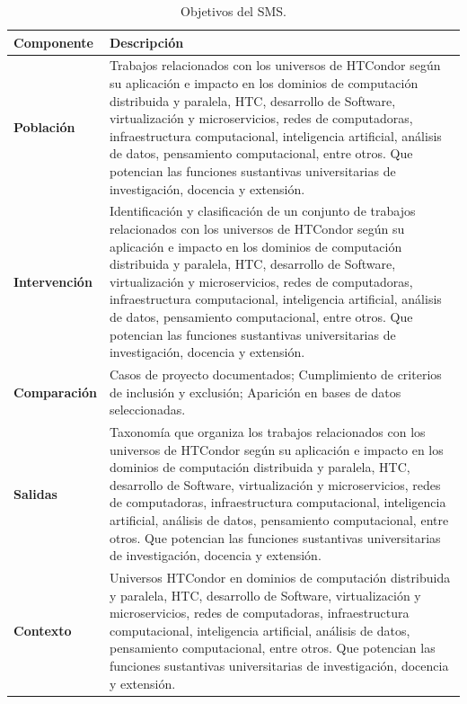 \begin{table}[htbp]
	\centering
	\caption{Objetivos del SMS.}
	\label{table:PICOC}
	\renewcommand{\arraystretch}{1}  %
	\begin{tabular}{p{1.4cm}p{6.4cm}}
		\toprule
		\textbf{Componente}  & \textbf{Descripción}                \\
		\midrule
		\textbf{Población} & Trabajos relacionados con los universos de HTCondor según su aplicación e impacto en los dominios de computación distribuida y paralela, HTC, desarrollo de Software, virtualización y microservicios, redes de computadoras, infraestructura computacional, inteligencia artificial, análisis de datos, pensamiento computacional, entre otros. Que potencian las funciones sustantivas universitarias de investigación, docencia y extensión.\\
		\addlinespace[0.8em]
		\textbf{Intervención} & Identificación y clasificación de un conjunto de trabajos relacionados con los universos de HTCondor según su aplicación e impacto en los dominios de computación distribuida y paralela, HTC, desarrollo de Software, virtualización y microservicios, redes de computadoras, infraestructura computacional, inteligencia artificial, análisis de datos, pensamiento computacional, entre otros. Que potencian las funciones sustantivas universitarias de investigación, docencia y extensión.\\
        \addlinespace[0.8em]
		\textbf{Comparación} & Casos de proyecto documentados; Cumplimiento de criterios de inclusión y exclusión; Aparición en bases de datos seleccionadas.\\
        \addlinespace[0.8em]
		\textbf{Salidas} & Taxonomía que organiza los trabajos relacionados con los universos de HTCondor según su aplicación e impacto en los dominios de computación distribuida y paralela, HTC, desarrollo de Software, virtualización y microservicios, redes de computadoras, infraestructura computacional, inteligencia artificial, análisis de datos, pensamiento computacional, entre otros. Que potencian las funciones sustantivas universitarias de investigación, docencia y extensión.\\
        \addlinespace[0.8em]
		\textbf{Contexto} & Universos HTCondor en dominios de computación distribuida y paralela, HTC, desarrollo de Software, virtualización y microservicios, redes de computadoras, infraestructura computacional, inteligencia artificial, análisis de datos, pensamiento computacional, entre otros. Que potencian las funciones sustantivas universitarias de investigación, docencia y extensión.\\
		\bottomrule
	\end{tabular}
\end{table}

